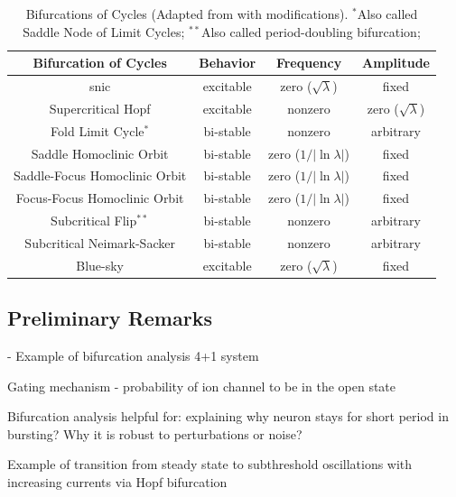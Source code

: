 \documentclass[../main.tex]{subfiles}
\begin{document}
\begin{table}[h!]
    \centering
    \begin{tabular}{|c||c|c|c|}
        \hline
        Bifurcation of Cycles & Behavior & Frequency & Amplitude \\
        \hline
        \hline
        \gls{snic} & excitable & zero ($\sqrt{\lambda}$) & fixed \\
        Supercritical Hopf & excitable & nonzero & zero ($\sqrt{\lambda}$) \\
        Fold Limit Cycle$^{*}$ & bi-stable & nonzero & arbitrary \\
        Saddle Homoclinic Orbit & bi-stable & zero ($1/|\ln{\lambda}|$) & fixed \\
        Saddle-Focus Homoclinic Orbit & bi-stable & zero ($1/|\ln{\lambda}|$) & fixed \\
        Focus-Focus Homoclinic Orbit & bi-stable & zero ($1/|\ln{\lambda}|$) & fixed \\
        Subcritical Flip$^{**}$ & bi-stable & nonzero & arbitrary \\
        Subcritical Neimark-Sacker & bi-stable & nonzero & arbitrary \\
        Blue-sky & excitable & zero ($\sqrt{\lambda}$) & fixed \\
        \hline
    \end{tabular}
    \caption[Bifurcations of Cycles]{Bifurcations of Cycles
    (Adapted from \cite{izhikevichNEURALEXCITABILITYSPIKING2000} with modifications).
    $^{*}$Also called Saddle Node of Limit Cycles;
    $^{**}$Also called period-doubling bifurcation;}
    \label{tab:bifurcations_cycles}
\end{table}


\subsection{Preliminary Remarks}

\color{red}

\cite{golombContributionPersistentNa2006} - Example of bifurcation analysis 4+1 system

Gating mechanism - probability of ion channel to be in the open state

Bifurcation analysis helpful for: explaining why neuron stays for short period in bursting?
Why it is robust to perturbations or noise?

Example of transition from steady state to subthreshold oscillations with
increasing currents via Hopf bifurcation \cite{wangMultipleDynamicalModes1994}
\end{document}
